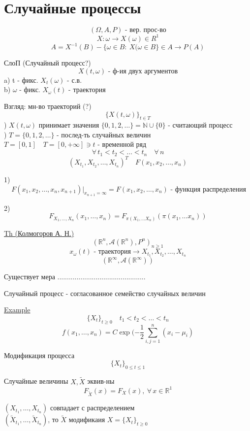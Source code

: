 \documentclass[a4paper]{article}
\begin{document}
\section*{\centering Случайные процессы}

\[
    (\Omega, A, P) \text{ - вер. прос-во}
\]
\[
    X: \omega \to X(\omega) \in R^{1} 
\]
\[
    A = X^{-1}(B) - \{ \omega \in B: \ X(\omega \in B\} \in A \to P(A)
\]

СлоП (Случайный процесс?)
\[
    X(t, \omega) \text{ - ф-ия двух аргументов}
\]
a) t - фикс. $ X_t(\omega) $ - с.в.\\
b) $ \omega $ - фикс. $ X_\omega(t) $ - траектория

Взгляд: мн-во траекторий (?)
\[
    \{ X(t,\omega) \}_{t \in T}
\]
) $ X(t,\omega) $ принимает значения $ \{ 0, 1, 2, \dots \} = \mathbb{N} \cup \{ 0 \}$ 
- считающий процесс\\
) $ T = \{ 0, 1, 2, \dots \} $ - послед-ть случайных величин\\
$ T = [0, 1] \quad T = [0, +\infty] \ni t $ - временной ряд
\[
    \forall \, t_1 <t_2 < \dots < t_n \quad \forall \, n
\]
\[
    (X_{t_1}, X_{t_2}, \dots, X_{t_n})^{T} \quad F(x_1, x_2, \dots, x_n)
\]

1)
\[
     \ F(x_1, x_2, \dots, x_n, x_{n+1}) |_{x_{n+1} = \infty} = F(x_1, x_2, \dots, x_n)
    \text{ - функция распределения}
\]

2)
\[
    F_{X_1, \dots, X_n}(x_1, \dots, x_n) = F_{\pi(X_1, \dots X_n)}(\pi(x_1, \dots x_n))
\]

\begin{tcolorbox}
    \underline{Th (Колмогоров А. Н.)}
    \[
        (\mathbb{R}^{n}, \mathcal{A}(\mathbb{R}^{n}), P^{n})_{n \geq 1}
    \]
    \[
        x_{\omega}(t) \text{ - траектория}  \to X_{t_1}, X_{t_2}, \dots, X_{t_n}
    \]
    \[
        (\mathbb{R}^{\infty}, \mathcal{A}( \mathbb{R}^{\infty}))
    \]

    Существует мера ..............................................
\end{tcolorbox}

\begin{tcolorbox}
    Случайный процесс - согласованное семейство случайных величин
\end{tcolorbox}

\begin{tcolorbox}
\underline{Example}
\[
    \{ X_t \}_{t \geq 0} \quad t_1 < t_2< \dots <  t_n
\]
\[
    f(x_1, \dots, x_n) = C \exp(-\frac{1}{2} \sum_{i,j = 1}^{n} (x_i - \mu_i) 
\]

Модификация процесса
\[
    \{ X_t \}_{0 \leq t \leq 1}
\]

Случайные величины $ X, \widetilde{X} $ эквив-ны
\[
    F_{\widetilde{X}}(x) = F_X(x), \ \forall \, x \in \mathbb{R}^{1}
\]

$ (X_{t_1}, \dots, X_{t_n}) $ совпадает с распределением\\
$ (\widetilde{X}_{t_1}, \dots, \widetilde{X}_{t_n}) $, то $ \widetilde{X} $ 
модификаия $ X = \{ X_t \}_{t \geq 0} $ 
\end{tcolorbox}
\end{document}
